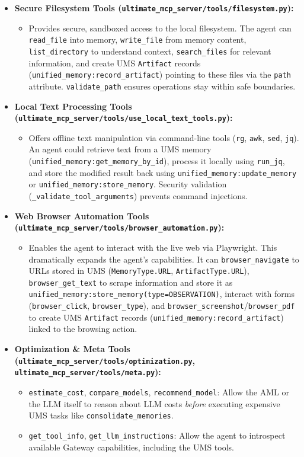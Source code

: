 \documentclass[12pt,a4paper]{article}
\newcommand{\code}[1]{\nolinkurl{#1}}
\begin{document}
\begin{itemize}
    \item \textbf{Secure Filesystem Tools (\code{ultimate\_mcp\_server/tools/filesystem.py}):}
    \begin{itemize}
        \item Provides secure, sandboxed access to the local filesystem. The agent can \code{read\_file} into memory, \code{write\_file} from memory content, \code{list\_directory} to understand context, \code{search\_files} for relevant information, and create UMS \code{Artifact} records (\code{unified\_memory:record\_artifact}) pointing to these files via the \code{path} attribute. \code{validate\_path} ensures operations stay within safe boundaries.
    \end{itemize}

    \item \textbf{Local Text Processing Tools (\code{ultimate\_mcp\_server/tools/use\_local\_text\_tools.py}):}
    \begin{itemize}
        \item Offers offline text manipulation via command-line tools (\code{rg}, \code{awk}, \code{sed}, \code{jq}). An agent could retrieve text from a UMS memory (\code{unified\_memory:get\_memory\_by\_id}), process it locally using \code{run\_jq}, and store the modified result back using \code{unified\_memory:update\_memory} or \code{unified\_memory:store\_memory}. Security validation (\code{\_validate\_tool\_arguments}) prevents command injections.
    \end{itemize}

    \item \textbf{Web Browser Automation Tools (\code{ultimate\_mcp\_server/tools/browser\_automation.py}):}
    \begin{itemize}
        \item Enables the agent to interact with the live web via Playwright. This dramatically expands the agent's capabilities. It can \code{browser\_navigate} to URLs stored in UMS (\code{MemoryType.URL}, \code{ArtifactType.URL}), \code{browser\_get\_text} to scrape information and store it as \code{unified\_memory:store\_memory(type=OBSERVATION)}, interact with forms (\code{browser\_click}, \code{browser\_type}), and \code{browser\_screenshot}/\code{browser\_pdf} to create UMS \code{Artifact} records (\code{unified\_memory:record\_artifact}) linked to the browsing action.
    \end{itemize}

    \item \textbf{Optimization \& Meta Tools (\code{ultimate\_mcp\_server/tools/optimization.py}, \code{ultimate\_mcp\_server/tools/meta.py}):}
    \begin{itemize}
        \item \code{estimate\_cost}, \code{compare\_models}, \code{recommend\_model}: Allow the AML or the LLM itself to reason about LLM costs \textit{before} executing expensive UMS tasks like \code{consolidate\_memories}.
        \item \code{get\_tool\_info}, \code{get\_llm\_instructions}: Allow the agent to introspect available Gateway capabilities, including the UMS tools.
    \end{itemize}
\end{itemize}
\end{document}
